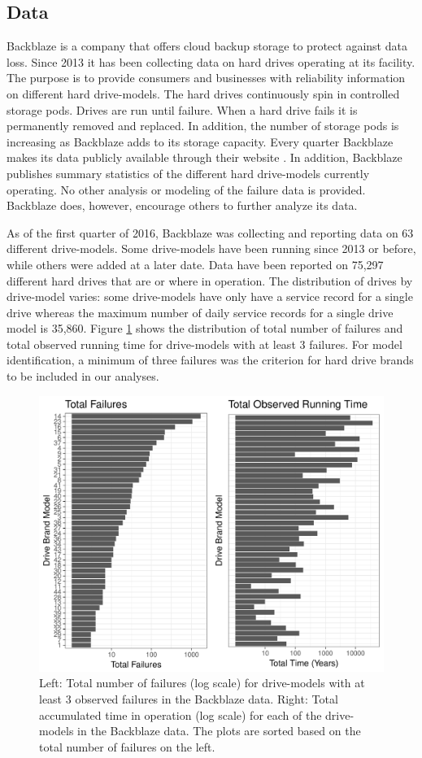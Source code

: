 \documentclass[12pt]{article}
\begin{document}
\subsection{Data}
\label{sec:Data}
Backblaze is a company that offers cloud backup storage to protect against data loss.  Since 2013 it has been collecting data on hard drives operating at its facility.  The purpose is to provide consumers and businesses with reliability information on different hard drive-models.  The hard drives continuously spin in controlled storage pods.  Drives are run until failure.  When a hard drive fails it is permanently removed and replaced.  In addition, the number of storage pods is increasing as Backblaze adds to its storage capacity.  Every quarter Backblaze makes its data publicly available through their website \cite{backblaze}. In addition, Backblaze publishes summary statistics of the different hard drive-models currently operating.  No other analysis or modeling of the failure data is provided.  Backblaze does, however, encourage others to further analyze its data. 

As of the first quarter of 2016, Backblaze was collecting and reporting data on 63 different drive-models.  Some drive-models have been running since 2013 or before, while others were added at a later date.  Data have been reported on 75,297 different hard drives that are or where in operation.  The distribution of drives by drive-model varies: some drive-models have only have a service record for a single drive whereas the maximum number of daily service records for a single drive model is 35,860.  Figure \ref{fig1} shows the distribution of total number of failures and total observed running time for drive-models with at least 3 failures.  For model identification, a minimum of three failures was the criterion for hard drive brands to be included in our analyses.  

\begin{figure}[H]
  \includegraphics[width=.9\textwidth]{fig/data-sum.pdf}
  \caption{Left: Total number of failures (log scale) for drive-models with at least 3 observed failures in the Backblaze data. Right: Total accumulated time in operation (log scale) for each of the drive-models in the Backblaze data.  The plots are sorted based on the total number of failures on the left.}
  \label{fig1}
\end{figure}
\end{document}
